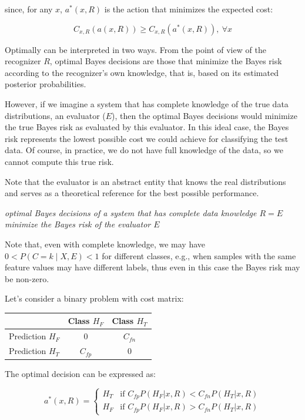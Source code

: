 since, for any $x$, $a^*(x,R)$ is the action that minimizes the expected cost:

\begin{equation*}
C_{x,R}(a(x,R)) \geq C_{x,R}(a^*(x,R)),\ \forall x
\end{equation*}

Optimally can be interpreted in two ways. From the point of view of the recognizer $R$, optimal Bayes decisions are those that minimize the Bayes risk according to the recognizer's own knowledge, that is, based on its estimated posterior probabilities.

However, if we imagine a system that has complete knowledge of the true data distributions, an evaluator ($E$), then the optimal Bayes decisions would minimize the true Bayes risk as evaluated by this evaluator. In this ideal case, the Bayes risk represents the lowest possible cost we could achieve for classifying the test data. Of course, in practice, we do not have full knowledge of the data, so we cannot compute this true risk.

Note that the evaluator is an abstract entity that knows the real distributions and serves as a theoretical reference for the best possible performance.

\textit{optimal Bayes decisions of a system that has complete data knowledge $R = E$ minimize the Bayes risk of the evaluator $E$}

Note that, even with complete knowledge, we may have $0 < P(C = k \mid X, E) < 1$ for different classes, e.g., when samples with the same feature values may have different labels, thus even in this case the Bayes risk may be non-zero.

Let's consider a binary problem with cost matrix:

\begin{center}
\begin{tabular}{l|cc}
 & Class $H_F$ & Class $H_T$ \\
\hline
Prediction $H_F$ & $0$ & $C_{fn}$ \\
Prediction $H_T$ & $C_{fp}$ & $0$
\end{tabular}
\end{center}

The optimal decision can be expressed as:

\begin{equation*}
a^*(x, R) = \begin{cases}
H_T & \text{if } C_{fp} P(H_F|x, R) < C_{fn} P(H_T|x, R) \\
H_F & \text{if } C_{fp} P(H_F|x, R) > C_{fn} P(H_T|x, R)
\end{cases}
\end{equation*}

